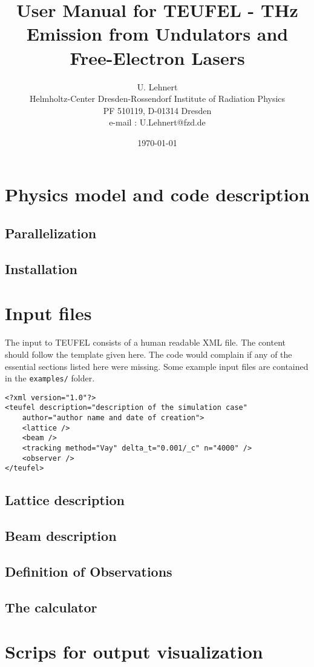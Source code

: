 \documentclass[11pt]{article}
\title{User Manual for TEUFEL - THz Emission from Undulators and Free-Electron Lasers}
\author{U. Lehnert\\
\footnotesize{Helmholtz-Center Dresden-Rossendorf}
\footnotesize{Institute of Radiation Physics}\\
\footnotesize{PF 510119, D-01314 Dresden}\\
\footnotesize{e-mail : U.Lehnert@fzd.de}}
\date{\today\\[1cm]}
\begin{document}
\maketitle
\tableofcontents

\section{Physics model and code description}

\subsection{Parallelization}

\subsection{Installation}

\section{Input files}

The input to TEUFEL consists of a human readable XML file. The content should follow
the template given here. The code would complain if any of the essential sections
listed here were missing. Some example input files are contained in the \verb|examples/| folder.

\begin{lstlisting}
<?xml version="1.0"?>
<teufel description="description of the simulation case"
    author="author name and date of creation">
    <lattice />
    <beam />
    <tracking method="Vay" delta_t="0.001/_c" n="4000" />
    <observer />
</teufel>
\end{lstlisting}

\subsection{Lattice description}

\subsection{Beam description}

\subsection{Definition of Observations}

\subsection{The calculator}

\section{Scrips for output visualization}
\end{document}
